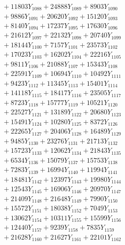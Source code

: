 \documentclass[a4paper,10pt]{article}
\begin{document}
{\begin{align}
&\;  + 11803 Y_{1088} + 24888 Y_{1089} + 8903 Y_{1090} \\[0.3ex]
&\;  + 9886 Y_{1091} + 20620 Y_{1092} + 15120 Y_{1093} \\[0.3ex]
&\;  + 8140 Y_{1094} + 17237 Y_{1095} + 17630 Y_{1096} \\[0.3ex]
&\;  + 21612 Y_{1097} + 22132 Y_{1098} + 20740 Y_{1099} \\[0.3ex]
&\;  + 18144 Y_{1100} + 7157 Y_{1101} + 23573 Y_{1102} \\[0.3ex]
&\;  + 17023 Y_{1103} + 16202 Y_{1104} + 22216 Y_{1105} \\[0.3ex]
&\;  + 9811 Y_{1106} + 21088 Y_{1107} + 15343 Y_{1108} \\[0.5ex]\allowbreak
&\;  + 22591 Y_{1109} + 10694 Y_{1110} + 10492 Y_{1111} \\[0.3ex]
&\;  + 9423 Y_{1112} + 11345 Y_{1113} + 15401 Y_{1114} \\[0.3ex]
&\;  + 14118 Y_{1115} + 18417 Y_{1116} + 23505 Y_{1117} \\[0.3ex]
&\;  + 8723 Y_{1118} + 15777 Y_{1119} + 10521 Y_{1120} \\[0.3ex]
&\;  + 22527 Y_{1121} + 13189 Y_{1122} + 20680 Y_{1123} \\[0.3ex]
&\;  + 15491 Y_{1124} + 10280 Y_{1125} + 8372 Y_{1126} \\[0.3ex]
&\;  + 22265 Y_{1127} + 20406 Y_{1128} + 16489 Y_{1129} \\[0.3ex]
&\;  + 9485 Y_{1130} + 23276 Y_{1131} + 21713 Y_{1132} \\[0.3ex]
&\;  + 15723 Y_{1133} + 12062 Y_{1134} + 21843 Y_{1135} \\[0.3ex]
&\;  + 6534 Y_{1136} + 15079 Y_{1137} + 15753 Y_{1138} \\[0.5ex]\allowbreak
&\;  + 7283 Y_{1139} + 16994 Y_{1140} + 11994 Y_{1141} \\[0.3ex]
&\;  + 18481 Y_{1142} + 12397 Y_{1143} + 19980 Y_{1144} \\[0.3ex]
&\;  + 12543 Y_{1145} + 16906 Y_{1146} + 20970 Y_{1147} \\[0.3ex]
&\;  + 21409 Y_{1148} + 21648 Y_{1149} + 7990 Y_{1150} \\[0.3ex]
&\;  + 15572 Y_{1151} + 18038 Y_{1152} + 7049 Y_{1153} \\[0.3ex]
&\;  + 13062 Y_{1154} + 10311 Y_{1155} + 15599 Y_{1156} \\[0.3ex]
&\;  + 12440 Y_{1157} + 9239 Y_{1158} + 7835 Y_{1159} \\[0.3ex]
&\;  + 21628 Y_{1160} + 21627 Y_{1161} + 22101 Y_{1162} \\[0.3ex]

\end{align}}
\end{document}
